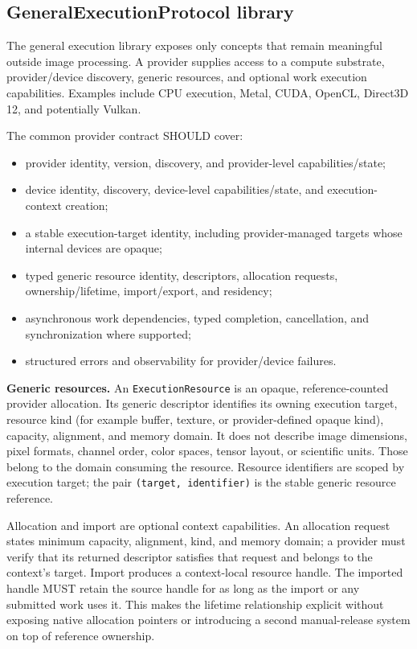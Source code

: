 \documentclass[11pt,a4paper,oneside]{article}
\begin{document}
\subsection{GeneralExecutionProtocol library}

The general execution library exposes only concepts that remain meaningful outside image processing. A provider supplies access to a compute substrate, provider/device discovery, generic resources, and optional work execution capabilities. Examples include CPU execution, Metal, CUDA, OpenCL, Direct3D 12, and potentially Vulkan.

The common provider contract SHOULD cover:
\begin{itemize}
  \item provider identity, version, discovery, and provider-level capabilities/state;
  \item device identity, discovery, device-level capabilities/state, and execution-context creation;
  \item a stable execution-target identity, including provider-managed targets whose internal devices are opaque;
  \item typed generic resource identity, descriptors, allocation requests, ownership/lifetime, import/export, and residency;
  \item asynchronous work dependencies, typed completion, cancellation, and synchronization where supported;
  \item structured errors and observability for provider/device failures.
\end{itemize}

\textbf{Generic resources.} An \texttt{ExecutionResource} is an opaque, reference-counted provider allocation. Its generic descriptor identifies its owning execution target, resource kind (for example buffer, texture, or provider-defined opaque kind), capacity, alignment, and memory domain. It does not describe image dimensions, pixel formats, channel order, color spaces, tensor layout, or scientific units. Those belong to the domain consuming the resource. Resource identifiers are scoped by execution target; the pair \texttt{(target, identifier)} is the stable generic resource reference.

Allocation and import are optional context capabilities. An allocation request states minimum capacity, alignment, kind, and memory domain; a provider must verify that its returned descriptor satisfies that request and belongs to the context's target. Import produces a context-local resource handle. The imported handle MUST retain the source handle for as long as the import or any submitted work uses it. This makes the lifetime relationship explicit without exposing native allocation pointers or introducing a second manual-release system on top of reference ownership.
\end{document}
